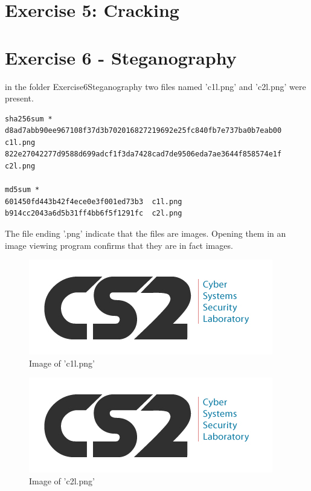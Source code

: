 \documentclass[a4paper,10pt,oneside]{article}
\begin{document}
\section{Exercise 5: Cracking }


\newpage
\section{Exercise 6 - Steganography}
in the folder Exercise6\textunderscore Steganography two files named 'c1l.png' and 'c2l.png' were present.

\begin{lstlisting}[caption= SHA256 and MD5 sum of files in Exercise6\textunderscore Steganography]
sha256sum *
d8ad7abb90ee967108f37d3b702016827219692e25fc840fb7e737ba0b7eab00  c1l.png
822e27042277d9588d699adcf1f3da7428cad7de9506eda7ae3644f858574e1f  c2l.png

md5sum *
601450fd443b42f4ece0e3f001ed73b3  c1l.png
b914cc2043a6d5b31ff4bb6f5f1291fc  c2l.png
\end{lstlisting}

The file ending '.png' indicate that the files are images. Opening them in an image viewing program confirms that they are in fact images.

\begin{figure}[ht]
  \includegraphics[width=\textwidth]{images/c1l}
  \caption{Image of 'c1l.png'}
  \centering
\end{figure}





\begin{figure}[ht]
  \includegraphics[width=\textwidth]{images/c2l}
  \caption{Image of 'c2l.png'}
  \centering
\end{figure}
\end{document}
